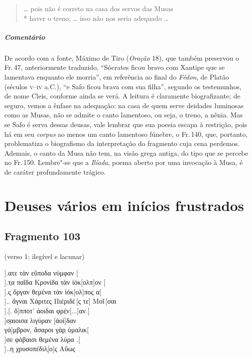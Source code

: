 \begin{verse}
\ldots{} pois não é correto na casa dos servos das Musas\\*
haver o treno; \ldots{} isso não nos seria adequado \ldots{}
\end{verse}

{\paragraph{Comentário} De acordo com a fonte, Máximo de Tiro (\textit{Oração} 18), que também preservou o Fr.\,47, anteriormente traduzido, ``Sócrates ficou bravo com Xantipe que se
lamentava enquanto ele morria”, em referência ao final do \textit{Fédon}, de
Platão (séculos \textsc{v--iv} a.C.), ``e Safo ficou brava com sua filha”, segundo os testemunhos, de
nome Cleis, conforme ainda se verá. A leitura é
claramente biografizante; de seguro, vemos a ênfase na adequação: na casa de quem serve
deidades luminosas como as Musas, não se admite o canto lamentoso, ou seja, o
treno, a nênia. Mas se Safo é serva dessas deusas, vale lembrar que sua poesia
escapa à restrição, pois há em seu \textit{corpus} ao menos um canto lamentoso
fúnebre, o Fr.\,140, que, portanto, problematiza o biografismo da interpretação
do fragmento cuja cena perdemos. Ademais, o canto da Musa não tem, na visão grega antiga,
do tipo que se percebe no Fr.\,150. Lembre"-se que a \textit{Ilíada},
poema aberto por uma invocação à Musa, é de caráter
profundamente trágico.}


\chapter{Deuses vários em inícios frustrados}


\section{Fragmento 103}

\begin{gkverse}
\textnormal{(verso 1: ilegível e lacunar)}

].ατε τὰν εὔποδα νύμφαν [\\[8pt]
].τ̣α παῖδα Κρονίδα τὰν ἰόκ[ολπ]ον [\\[8pt]
].ς̣ ὄργαν θεμένα τὰν ἰόκ[ολ]πος α[\\[8pt]
 ].. ἄγναι Χάριτες Πιέριδέ\,[ς τε] Μοῖ\,[σαι\\[8pt]
     ].[. ὄ]πποτ’ ἀοιδαι φρέ̣ν[...]αν.[\\[8pt]
             ]σ̣αιοισα λιγύραν [ἀοί]δαν\\[8pt]
         γά]μβρον, ἄσαροι γ̣ὰρ̣ ὐμαλικ[\\[8pt]
  ]σε φόβαισι θεμένα λύρα .[\\[8pt]
  ]..η χρυσοπέδιλ̣[ο]ς Αὔως
\end{gkverse}

